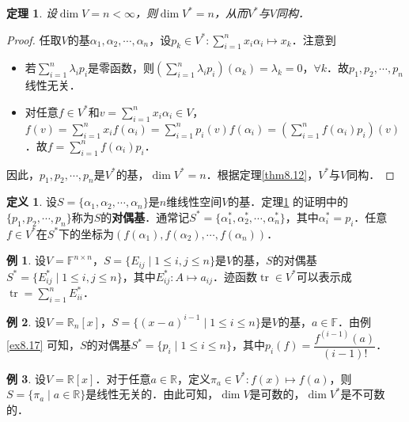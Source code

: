 \documentclass[a4paper,fontset=windows]{ctexbook}
\newtheorem{theorem}{定理}[chapter]
\theoremstyle{definition}
\newtheorem{definition}{定义}[chapter]
\newtheorem{example}{例}[chapter]
\DeclareMathOperator{\tr}{tr}
\renewcommand{\le}{\leqslant}
\begin{document}
\begin{theorem}\label{thm9.8}
设$\dim V=n<\infty$，则$\dim V^*=n$，从而$V^*$与$V$同构．
\end{theorem}

\begin{proof}
任取$V$的基$\alpha_1,\alpha_2,\cdots,\alpha_n$，设$p_k\in V^*:\sum\limits_{i=1}^nx_i\alpha_i\mapsto x_k$．注意到
\begin{itemize}
\item 若$\sum\limits_{i=1}^n\lambda_i p_i$是零函数，则$\left(\sum\limits_{i=1}^n\lambda_i p_i\right)(\alpha_k)=\lambda_k=0$，$\forall k$．故$p_1,p_2,\cdots,p_n$线性无关．
\item 对任意$f\in V^*$和$v=\sum\limits_{i=1}^nx_i\alpha_i\in V$，$f(v)=\sum\limits_{i=1}^nx_if(\alpha_i)=\sum\limits_{i=1}^np_i(v)f(\alpha_i)=\left(\sum\limits_{i=1}^nf(\alpha_i)p_i\right)(v)$．故$f=\sum\limits_{i=1}^nf(\alpha_i)p_i$．
\end{itemize}
因此，$p_1,p_2,\cdots,p_n$是$V^*$的基，$\dim V^*=n$．根据定理\ref{thm8.12}，$V^*$与$V$同构．
\end{proof}

\begin{definition}
设$S=\{\alpha_1,\alpha_2,\cdots,\alpha_n\}$是$n$维线性空间$V$的基．定理\ref{thm9.8} 的证明中的$\{p_1,p_2,\cdots,p_n\}$称为$S$的{\bf 对偶基}．通常记$S^*=\{\alpha_1^*,\alpha_2^*,\cdots,\alpha_n^*\}$，其中$\alpha_i^*=p_i$．任意$f\in V^*$在$S^*$下的坐标为$(f(\alpha_1),f(\alpha_2),\cdots,f(\alpha_n))$．
\end{definition}

\begin{example}
设$V=\mathbb{F}^{n\times n}$，$S=\{E_{ij}\mid 1\le i,j\le n\}$是$V$的基，$S$的对偶基$S^*=\{E_{ij}^*\mid 1\le i,j\le n\}$，其中$E_{ij}^*:A\mapsto a_{ij}$．迹函数$\tr\in V^*$可以表示成$\tr=\sum\limits_{i=1}^nE_{ii}^*$．
\end{example}

\begin{example}
设$V=\mathbb{R}_n[x]$，$S=\{(x-a)^{i-1}\mid 1\le i\le n\}$是$V$的基，$a\in\mathbb{F}$．由例\ref{ex8.17} 可知，$S$的对偶基$S^*=\{p_i\mid 1\le i\le n\}$，其中$p_i(f)=\dfrac{f^{(i-1)}(a)}{(i-1)!}$．
\end{example}

\begin{example}\label{ex9.9}
设$V=\mathbb{R}[x]$．对于任意$a\in\mathbb{R}$，定义$\pi_a\in V^*:f(x)\mapsto f(a)$，则$S=\{\pi_a\mid a\in\mathbb{R}\}$是线性无关的．由此可知，$\dim V$是可数的，$\dim V^*$是不可数的．
\end{example}
\end{document}
